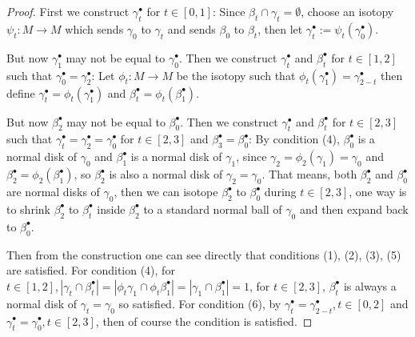 \begin{proof}
    First we construct $\gamma_t^\bullet$ for $t\in [0,1]$: Since $\beta_t \cap \gamma_t=\emptyset$, choose an isotopy $\psi_t: M\to M$ which sends $\gamma_0$ to $\gamma_t$ and sends $\beta_0$ to $\beta_t$, then let $\gamma_t^\bullet :=\psi_t(\gamma_0^\bullet)$. 

    But now $\gamma_1^\bullet$ may not be equal to $\gamma_0^\bullet$. Then we construct $\gamma_t^\bullet$ and $\beta_t^\bullet$ for $t\in [1,2]$ such that $\gamma_0^\bullet=\gamma_2^\bullet$: Let $\phi_t: M\to M$ be the isotopy such that $\phi_t(\gamma_{1}^\bullet)=\gamma_{2-t}^\bullet$ then define $\gamma_t^\bullet=\phi_t(\gamma_1^\bullet)$ and $\beta_t^\bullet=\phi_t(\beta_1^\bullet)$.

    But now $\beta_2^\bullet$ may not be equal to $\beta_0^\bullet$. Then we construct $\gamma_t^\bullet$ and $\beta_t^\bullet$ for $t\in [2,3]$ such that $\gamma_t^\bullet=\gamma_2^\bullet=\gamma_0^\bullet$ for $t\in [2,3]$ and $\beta_3^\bullet=\beta_0^\bullet$: By condition (4), $\beta_0^\bullet$ is a normal disk of $\gamma_0$ and $\beta_1^\bullet$ is a normal disk of $\gamma_1$, since $\gamma_2=\phi_2(\gamma_1)=\gamma_0$ and $\beta_2^\bullet =\phi_2(\beta_1^\bullet)$, so $\beta_2^\bullet$ is also a normal disk of $\gamma_2=\gamma_0$. That means, both $\beta_2^\bullet$ and $\beta_0^\bullet$ are normal disks of $\gamma_0$, then we can isotope $\beta_2^\bullet$ to $\beta_0^\bullet$ during $t\in [2,3]$, one way is to shrink $\beta_2^\bullet$ to $\beta_t^\bullet$ inside $\beta_2^\bullet$ to a standard normal ball of $\gamma_0$ and then expand back to $\beta_0^\bullet$.

    Then from the construction one can see directly that conditions (1), (2), (3), (5) are satisfied. For condition (4), for $t\in [1,2], |\gamma_t\cap \beta_t^\bullet|=|\phi_t\gamma_1\cap \phi_t\beta_1^\bullet|=|\gamma_1\cap \beta_1^\bullet|=1$, for $t\in [2,3]$, $\beta_t^\bullet$ is always a normal disk of $\gamma_t=\gamma_0$ so satisfied. For condition (6), by $\gamma_t^\bullet=\gamma_{2-t}^\bullet, t\in [0,2]$ and $\gamma_t^\bullet=\gamma_0^\bullet, t\in [2,3]$, then of course the condition is satisfied.
\end{proof}


